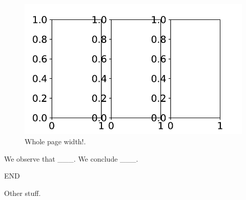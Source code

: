 \documentclass[twocolumn]{article}
\begin{document}
\begin{figure}[h]
  \includegraphics[width=\textwidth]{wide.pdf} %
  \caption{Whole page width!.}
  \label{fig:wide}
\end{figure}

We observe that \_\_\_.  We conclude \_\_\_.

END

Other stuff.
\end{document}

